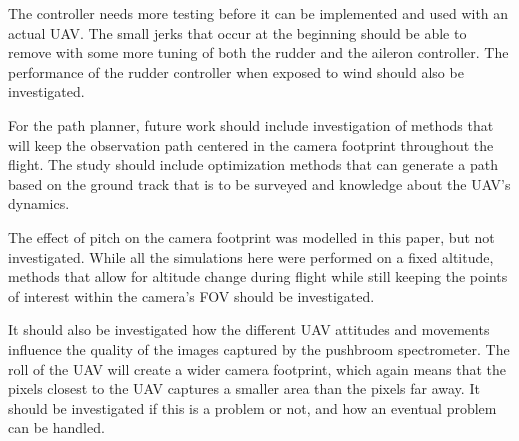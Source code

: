 The controller needs more testing before it can be implemented and used with an actual UAV. The small jerks that occur at the beginning should be able to remove with some more tuning of both the rudder and the aileron controller. The performance of the rudder controller when exposed to wind should also be investigated.

For the path planner, future work should include investigation of methods that will keep the observation path centered in the camera footprint throughout the flight. The study should include optimization methods that can generate a path based on the ground track that is to be surveyed and knowledge about the UAV's dynamics.

The effect of pitch on the camera footprint was modelled in this paper, but not investigated. While all the simulations here were performed on a fixed altitude, methods that allow for altitude change during flight while still keeping the points of interest within the camera's FOV should be investigated.

It should also be investigated how the different UAV attitudes and movements influence the quality of the images captured by the pushbroom spectrometer. The roll of the UAV will create a wider camera footprint, which again means that the pixels closest to the UAV captures a smaller area than the pixels far away. It should be investigated if this is a problem or not, and how an eventual problem can be handled.